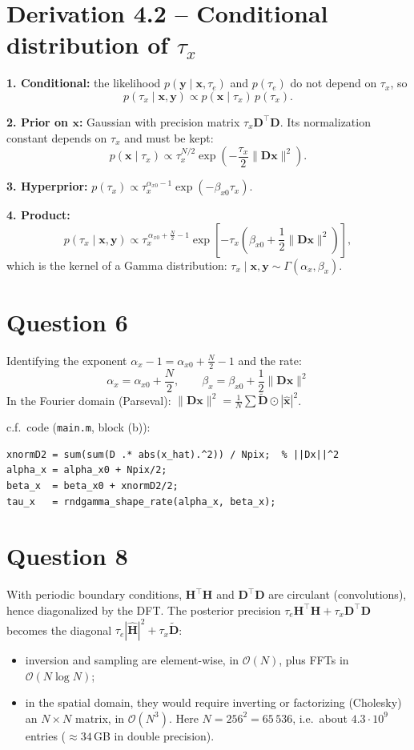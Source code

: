 \documentclass[11pt,a4paper]{article}
\newcommand{\Dt}{\tilde{\mathbf D}}
\begin{document}
\section*{Derivation 4.2 -- Conditional distribution of $\tau_x$}
\textbf{1. Conditional:} the likelihood $p(\mathbf y\mid\mathbf x,\tau_e)$ and $p(\tau_e)$ do not depend on $\tau_x$, so
\[
p(\tau_x\mid\mathbf x,\mathbf y) \propto p(\mathbf x\mid\tau_x)\,p(\tau_x).
\]

\textbf{2. Prior on $\mathbf x$:} Gaussian with precision matrix $\tau_x\mathbf D^\top\mathbf D$. Its normalization constant depends on $\tau_x$ and must be kept:
\[
p(\mathbf x\mid\tau_x) \propto \tau_x^{N/2}\exp\!\left(-\frac{\tau_x}{2}\|\mathbf D\mathbf x\|^2\right).
\]

\textbf{3. Hyperprior:} $p(\tau_x)\propto\tau_x^{\alpha_{x0}-1}\exp(-\beta_{x0}\tau_x)$.

\textbf{4. Product:}
\[
p(\tau_x\mid\mathbf x,\mathbf y) \propto
\tau_x^{\,\alpha_{x0}+\frac N2-1}\exp\!\left[-\tau_x\left(\beta_{x0}+\frac12\|\mathbf D\mathbf x\|^2\right)\right],
\]
which is the kernel of a Gamma distribution: $\tau_x\mid\mathbf x,\mathbf y\sim\Gamma(\alpha_x,\beta_x)$.

\section*{Question 6}
Identifying the exponent $\alpha_x-1=\alpha_{x0}+\frac N2-1$ and the rate:
\[
\boxed{\;\alpha_x=\alpha_{x0}+\frac N2,\qquad \beta_x=\beta_{x0}+\frac12\|\mathbf D\mathbf x\|^2\;}
\]
In the Fourier domain (Parseval): $\|\mathbf D\mathbf x\|^2=\frac1N\sum\Dt\odot|\widehat{\mathbf x}|^2$.

c.f.\ code (\texttt{main.m}, block (b)):
\begin{verbatim}
xnormD2 = sum(sum(D .* abs(x_hat).^2)) / Npix;  % ||Dx||^2
alpha_x = alpha_x0 + Npix/2;
beta_x  = beta_x0 + xnormD2/2;
tau_x   = rndgamma_shape_rate(alpha_x, beta_x);
\end{verbatim}

\section*{Question 8}
With periodic boundary conditions, $\mathbf H^\top\mathbf H$ and $\mathbf D^\top\mathbf D$ are circulant (convolutions), hence diagonalized by the DFT. The posterior precision $\tau_e\mathbf H^\top\mathbf H+\tau_x\mathbf D^\top\mathbf D$ becomes the diagonal $\tau_e|\widehat{\mathbf H}|^2+\tau_x\Dt$:
\begin{itemize}
  \item inversion and sampling are element-wise, in $\mathcal O(N)$, plus FFTs in $\mathcal O(N\log N)$;
  \item in the spatial domain, they would require inverting or factorizing (Cholesky) an $N\times N$ matrix, in $\mathcal O(N^3)$. Here $N=256^2=65\,536$, i.e.\ about $4.3\cdot10^9$ entries ($\approx 34$\,GB in double precision).
\end{itemize}
\end{document}
